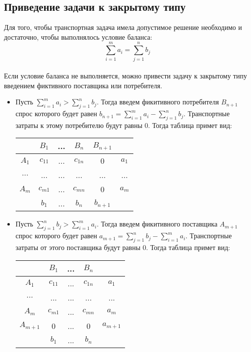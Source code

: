 \subsection{Приведение задачи к закрытому типу}
Для того, чтобы транспортная задача имела допустимое решение необходимо и достаточно, чтобы выполнялось условие баланса:
\begin{equation*}
\sum_{i=1}^m a_i = \sum_{j=1}^n b_j
\end{equation*}
\\
Если условие баланса не выполняется, можно привести задачу к закрытому типу введением фиктивного поставщика или потребителя.
\begin{itemize}
	\item Пусть $\sum_{i=1}^m a_i > \sum_{j=1}^n b_j$. Тогда введем фикитивного потребителя $B_{n+1}$ спрос которого будет равен $b_{n+1}= \sum_{i=1}^m a_i - \sum_{j=1}^n b_j$. Транспортные затраты к этому потребителю будут равны 0. Тогда таблица примет вид:
	\begin{table}[!ht]
	\centering
		\begin{tabular} {|c|c|c|c|c|c|}
			\hline
			 & $B_1$ & ... & $B_n$ & $B_{n+1}$ & \\ \hline
			$A_1$ & $c_{11}$ & ... & $c_{1n}$ & 0 & $a_1$ \\ \hline
			$...$ & ... & ... & ... & ... & ... \\ \hline
			$A_m$ & $c_{m1}$ & ... & $c_{mn}$ & 0 & $a_m$ \\ \hline
			 & $b_1$ & ... & $b_n$ & $b_{n+1}$ & \\ \hline
		\end{tabular}
\end{table}
	\item Пусть $\sum_{j=1}^n b_j > \sum_{i=1}^m a_i$. Тогда введем фикитивного поставщика $A_{m+1}$ спрос которого будет равен $a_{m+1}= \sum_{j=1}^n b_j - \sum_{i=1}^m a_i$. Транспортные затраты от этого поставщика будут равны 0. Тогда таблица примет вид:
	\begin{table}[!ht]
	\centering
		\begin{tabular} {|c|c|c|c|c|}
			\hline
			 & $B_1$ & ... & $B_n$ & \\ \hline
			$A_1$ & $c_{11}$ & ... & $c_{1n}$ & $a_1$ \\ \hline
			$...$ & ... & ... & ... & ...  \\ \hline
			$A_m$ & $c_{m1}$ & ... & $c_{mn}$ &  $a_m$ \\ \hline
			$A_{m+1}$ & 0 & ... & 0 &  $a_{m+1}$ \\ \hline
			 & $b_1$ & ... & $b_n$ & \\ \hline
		\end{tabular}
\end{table}
\end{itemize}


